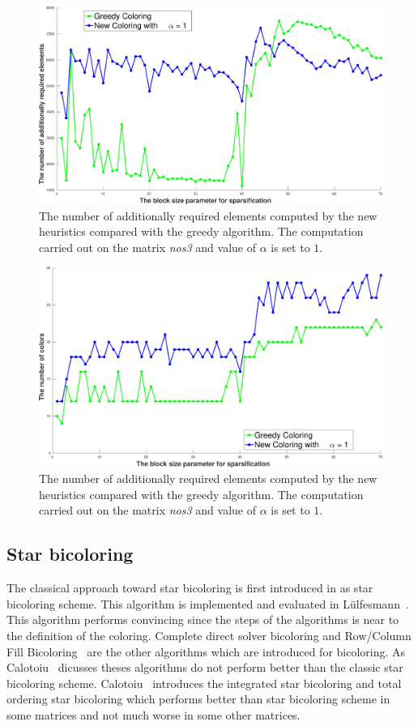 \documentclass[11pt, twoside,a4paper]{book}
\begin{document}
\begin{figure}
\centering
\includegraphics[width=0.9\linewidth]{bls_add_alpha_1_nos3}
\caption{The number of additionally required elements computed
by the new heuristics compared with the
greedy algorithm. The computation carried out on the matrix
\textit{nos3} and value of $\alpha$ is
set to $1$.}
\label{new.col.add.alpha.one.nos3}
\end{figure}
\begin{figure}
\centering
\includegraphics[width=0.9\linewidth]{bls_col_alpha_1_nos3}
\caption{The number of additionally required elements computed
by the new heuristics compared with the greedy algorithm.
The computation carried out on the matrix \textit{nos3}
and value of $\alpha$ is set to $1$.}
\label{new.col.col.alpha.one.nos3}
\end{figure}

\subsection{Star bicoloring}
\label{s.heuristic.starbicoloring}
The classical approach toward star bicoloring is first introduced in
\cite{Gebremedhin05whatcolor} as star bicoloring scheme.
This algorithm is implemented and evaluated in
Lülfesmann~\cite{LulfesmannMaster}. This algorithm performs convincing
since the steps of the algorithms is near to the definition of the coloring.
Complete direct solver bicoloring and Row/Column Fill Bicoloring~\cite{Hossain95computinga}
are the other algorithms which are introduced for bicoloring.
As Calotoiu~\cite{CalotoiuMaster} dicusses theses algorithms do not perform
better than the classic star bicoloring scheme.
Calotoiu~\cite{CalotoiuMaster} introduces the integrated star bicoloring
and total ordering star bicoloring which performs better than
star bicoloring scheme in some matrices and not much worse in some other
matrices.
\end{document}
